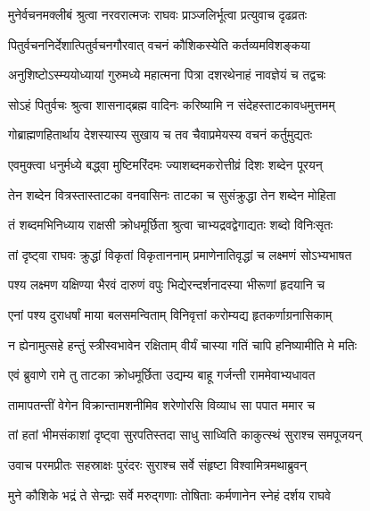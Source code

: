 
\twolineshloka
{मुनेर्वचनमक्लीबं श्रुत्वा नरवरात्मजः}
{राघवः प्राञ्जलिर्भूत्वा प्रत्युवाच दृढव्रतः} %

\twolineshloka
{पितुर्वचननिर्देशात्पितुर्वचनगौरवात्}
{वचनं कौशिकस्येति कर्तव्यमविशङ्कया} %

\twolineshloka
{अनुशिष्टोऽस्म्ययोध्यायां गुरुमध्ये महात्मना}
{पित्रा दशरथेनाहं नावज्ञेयं च तद्वचः} %

\twolineshloka
{सोऽहं पितुर्वचः श्रुत्वा शासनाद्ब्रह्म वादिनः}
{करिष्यामि न संदेहस्ताटकावधमुत्तमम्} %

\twolineshloka
{गोब्राह्मणहितार्थाय देशस्यास्य सुखाय च}
{तव चैवाप्रमेयस्य वचनं कर्तुमुद्यतः} %

\twolineshloka
{एवमुक्त्वा धनुर्मध्ये बद्ध्वा मुष्टिमरिंदमः}
{ज्याशब्दमकरोत्तीव्रं दिशः शब्देन पूरयन्} %

\twolineshloka
{तेन शब्देन वित्रस्तास्ताटका वनवासिनः}
{ताटका च सुसंक्रुद्धा तेन शब्देन मोहिता} %

\twolineshloka
{तं शब्दमभिनिध्याय राक्षसी क्रोधमूर्छिता}
{श्रुत्वा चाभ्यद्रवद्वेगाद्यतः शब्दो विनिःसृतः} %

\twolineshloka
{तां दृष्ट्वा राघवः क्रुद्धां विकृतां विकृताननाम्}
{प्रमाणेनातिवृद्धां च लक्ष्मणं सोऽभ्यभाषत} %

\twolineshloka
{पश्य लक्ष्मण यक्षिण्या भैरवं दारुणं वपुः}
{भिद्येरन्दर्शनादस्या भीरूणां हृदयानि च} %

\twolineshloka
{एनां पश्य दुराधर्षां माया बलसमन्विताम्}
{विनिवृत्तां करोम्यद्य हृतकर्णाग्रनासिकाम्} %

\twolineshloka
{न ह्येनामुत्सहे हन्तुं स्त्रीस्वभावेन रक्षिताम्}
{वीर्यं चास्या गतिं चापि हनिष्यामीति मे मतिः} %

\twolineshloka
{एवं ब्रुवाणे रामे तु ताटका क्रोधमूर्छिता}
{उद्यम्य बाहू गर्जन्ती राममेवाभ्यधावत} %

\twolineshloka
{तामापतन्तीं वेगेन विक्रान्तामशनीमिव}
{शरेणोरसि विव्याध सा पपात ममार च} %

\twolineshloka
{तां हतां भीमसंकाशां दृष्ट्वा सुरपतिस्तदा}
{साधु साध्विति काकुत्स्थं सुराश्च समपूजयन्} %

\twolineshloka
{उवाच परमप्रीतः सहस्राक्षः पुरंदरः}
{सुराश्च सर्वे संहृष्टा विश्वामित्रमथाब्रुवन्} %

\twolineshloka
{मुने कौशिके भद्रं ते सेन्द्राः सर्वे मरुद्गणाः}
{तोषिताः कर्मणानेन स्नेहं दर्शय राघवे} %

